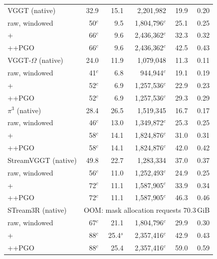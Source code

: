 \begin{table}[h]
\begin{tabular}{@{}l rrrrr@{}}
\midrule
VGGT (native) & 32.9 & 15.1 & 2{,}201{,}982 & 19.9 & 0.20 \\
\;raw, windowed & 50$^{c}$ & 9.5 & 1{,}804{,}796$^{c}$ & 25.1 & 0.25 \\
\;+\smr{} & 66$^{c}$ & 9.6 & 2{,}436{,}362$^{c}$ & 32.3 & 0.32 \\
\;+\smr{}+PGO & 66$^{c}$ & 9.6 & 2{,}436{,}362$^{c}$ & 42.5 & 0.43 \\
\midrule
VGGT-$\Omega$ (native) & 24.0 & 11.9 & 1{,}079{,}048 & 11.3 & 0.11 \\
\;raw, windowed & 41$^{c}$ & 6.8 & 944{,}944$^{c}$ & 19.1 & 0.19 \\
\;+\smr{} & 52$^{c}$ & 6.9 & 1{,}257{,}536$^{c}$ & 22.9 & 0.23 \\
\;+\smr{}+PGO & 52$^{c}$ & 6.9 & 1{,}257{,}536$^{c}$ & 29.3 & 0.29 \\
\midrule
$\pi^3$ (native) & 28.4 & 26.5 & 1{,}519{,}345 & 16.7 & 0.17 \\
\;raw, windowed & 46$^{c}$ & 13.0 & 1{,}349{,}872$^{c}$ & 25.3 & 0.25 \\
\;+\smr{} & 58$^{c}$ & 14.1 & 1{,}824{,}876$^{c}$ & 31.0 & 0.31 \\
\;+\smr{}+PGO & 58$^{c}$ & 14.1 & 1{,}824{,}876$^{c}$ & 42.0 & 0.42 \\
\midrule
StreamVGGT (native) & 49.8 & 22.7 & 1{,}283{,}334 & 37.0 & 0.37 \\
\;raw, windowed & 56$^{c}$ & 11.0 & 1{,}252{,}493$^{c}$ & 24.9 & 0.25 \\
\;+\smr{} & 72$^{c}$ & 11.1 & 1{,}587{,}905$^{c}$ & 33.9 & 0.34 \\
\;+\smr{}+PGO & 72$^{c}$ & 11.1 & 1{,}587{,}905$^{c}$ & 46.3 & 0.46 \\
\midrule
STream3R (native) & \multicolumn{5}{c}{OOM: mask allocation requests 70.3\,GiB} \\
\;raw, windowed & 67$^{c}$ & 21.1 & 1{,}804{,}796$^{c}$ & 29.9 & 0.30 \\
\;+\smr{} & 88$^{c}$ & 25.4$^{s}$ & 2{,}357{,}416$^{c}$ & 42.9 & 0.43 \\
\;+\smr{}+PGO & 88$^{c}$ & 25.4 & 2{,}357{,}416$^{c}$ & 59.0 & 0.59 \\
\bottomrule
\end{tabular}
\end{table}

